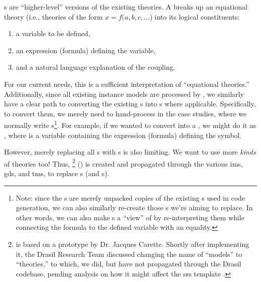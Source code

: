 \originalQDefinitionHaskell{}

\QDefinition{}s are ``higher-level'' versions of the existing theories. A
\QDefinition{} breaks up an equational theory (i.e., theories of the form \(x =
f(a, b, c, \ldots{}\)) into its logical constituents:
\begin{enumerate}
    \item a variable to be defined,
    \item an expression (formula) defining the variable,
    \item and a natural language explanation of the coupling.
\end{enumerate}

For our current needs, this is a sufficient interpretation of ``equational
theories.'' Additionally, since all existing instance models are processed by
\relToQD{}, we similarly have a clear path to converting the existing
\RelationConcept{}s into \QDefinition{}s where applicable. Specifically, to
convert them, we merely need to hand-process \relToQD{} in the case studies,
where we normally write \RelationConcept{}s\footnote{Note: since the
    \QDefinition{}s are merely unpacked copies of the existing \RelationConcept{}s
    used in code generation, we can also similarly re-create those
    \RelationConcept{}s we're aiming to replace. In other words, we can also make
    \RelationConcept{}s a ``view'' of \QDefinition{} by re-interpreting them while
    connecting the formula to the defined variable with an equality.}. For example,
if we wanted to convert  into a \QDefinition, we might do it
as , where  is a variable
containing the expression (formula) defining the  symbol.

\originalLandPosRCtoQD{}

However, merely replacing all \RelationConcept{}s with \QDefinition{}s is also
limiting. We want to use more \textit{kinds} of theories too! Thus,
\ModelKinds{} \footnote{\ModelKinds{} is based on a prototype by Dr. Jacques
    Carette. Shortly after implementing it, the Drasil Research Team discussed
    changing the name of ``models'' to ``theories,'' to which, we did, but have not
    propagated through the Drasil codebase, pending analysis on how it might affect
    the \acs{srs} template \cite{DrasilIssue2599RenamingModels}.}
() is created and propagated through the
various \acsp{im}, \acsp{gd}, and \acsp{tm}, to replace \RelationConcept{}s (and
\Relation{}s).

